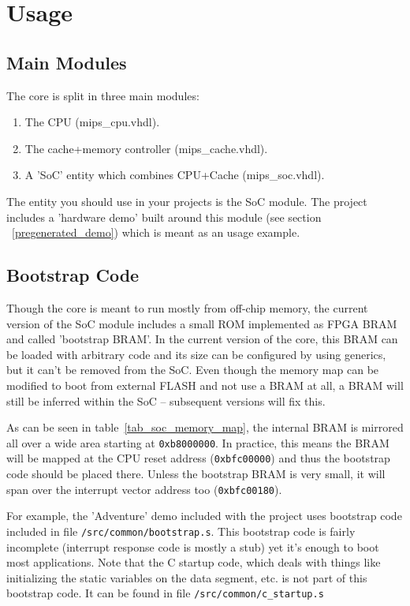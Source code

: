 
\chapter{Usage}

\section{Main Modules}
\label{main_modules}

The core is split in three main modules:

\begin{enumerate}
    \item The CPU (mips\_cpu.vhdl).
    \item The cache+memory controller (mips\_cache.vhdl).
    \item A 'SoC' entity which combines CPU+Cache (mips\_soc.vhdl).
\end{enumerate}

The entity you should use in your projects is the SoC module. The project 
includes a 'hardware demo' built around this module (see section 
~\ref{pregenerated_demo}) which is meant as an usage example.\\


\section{Bootstrap Code}
\label{bootstrap_code}

Though the core is meant to run mostly from off-chip memory, the current version
of the SoC module includes a small ROM implemented as FPGA BRAM and called 
'bootstrap BRAM'. In the current version of the core, this BRAM can be loaded
with arbitrary code and its size can be configured by using generics, but it 
can't be removed from the SoC. Even though the memory map can be modified to 
boot from external FLASH and not use a BRAM at all, a BRAM will still be 
inferred within the SoC -- subsequent versions will fix this.

As can be seen in table~\ref{tab_soc_memory_map}, the internal BRAM is mirrored
all over a wide area starting at \texttt{0xb8000000}. In practice, this means
the BRAM will be mapped at the CPU reset address (\texttt{0xbfc00000}) and thus
the bootstrap code should be placed there.
Unless the bootstrap BRAM is very small, it will span over the interrupt vector
address too (\texttt{0xbfc00180}).

For example, the 'Adventure' demo included with the project uses bootstrap 
code included in file \texttt{/src/common/bootstrap.s}. This bootstrap code
is fairly incomplete (interrupt response code is mostly a stub) yet it's enough
to boot most applications. 
Note that the C startup code, which deals with things like initializing the 
static variables on the data segment, etc. is not part of this bootstrap code. 
It can be found in file \texttt{/src/common/c\_startup.s}

